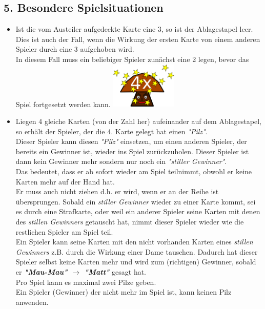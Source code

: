 \documentclass{article}
\begin{document}
\subsection*{5. Besondere Spielsituationen}
\begin{itemize} 
\item Ist die vom Austeiler aufgedeckte Karte eine 3, so ist der Ablagestapel leer. \\ Dies ist auch der Fall, wenn die Wirkung der ersten Karte von einem anderen Spieler durch eine 3 aufgehoben wird. \\ In diesem Fall muss ein beliebiger Spieler zunächst eine 2 legen, bevor das Spiel fortgesetzt werden kann.
\includegraphics[width=0.25\textwidth]{photos/mushroom.png}
\item Liegen 4 gleiche Karten (von der Zahl her) aufeinander auf dem Ablagestapel, so erhält der Spieler,  der die 4. Karte gelegt hat einen \textit{"Pilz"}. \\  Dieser Spieler kann diesen \textit{"Pilz"} einsetzen, um einen anderen Spieler, der bereits ein Gewinner ist, wieder ins Spiel zurückzuholen. Dieser Spieler ist dann kein Gewinner mehr sondern nur noch ein \textit{"stiller Gewinner"}. \\ Das bedeutet, dass er ab sofort wieder am Spiel teilnimmt, obwohl er keine Karten mehr auf der Hand hat. \\ Er muss auch nicht ziehen d.h. er wird, wenn er an der Reihe ist übersprungen. Sobald ein \textit{stiller Gewinner} wieder zu einer Karte kommt, sei es durch eine Strafkarte, oder weil ein anderer Spieler seine Karten mit denen des \textit{stillen Gewinners} getauscht hat, nimmt dieser Spieler wieder wie die restlichen Spieler am Spiel teil. \\
Ein Spieler kann seine Karten mit den nicht vorhanden Karten eines \textit{stillen Gewinners} z.B. durch die Wirkung einer Dame tauschen. Dadurch hat dieser Spieler selbst keine Karten mehr und wird zum (richtigen) Gewinner, sobald er \textit{\textbf{"Mau-Mau" $\rightarrow$ "Matt"}} gesagt hat. \\
Pro Spiel kann es maximal zwei Pilze geben. \\
Ein Spieler (Gewinner) der nicht mehr im Spiel ist,
kann keinen Pilz anwenden.
         

\end{itemize}
\end{document}
